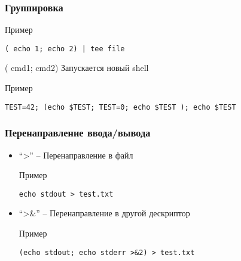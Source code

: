 \begin{frame}[fragile]
	\frametitle{Группировка}
	
	\begin{block}{Пример}
		\begin{lstlisting}
( echo 1; echo 2) | tee file
		\end{lstlisting}
	\end{block}

	\pause
	\begin{block}{( cmd1; cmd2)}
	    Запускается новый shell
	\end{block}

	\begin{block}{Пример}
		\begin{lstlisting}
TEST=42; (echo $TEST; TEST=0; echo $TEST ); echo $TEST
		\end{lstlisting}
	\end{block}

\end{frame}


\begin{frame}[fragile]
	\frametitle{Перенаправление ввода/вывода}

	\begin{itemize}
		\item ``>'' -- Перенаправление в файл
			\begin{block}{Пример}
				\begin{lstlisting}
echo stdout > test.txt
				\end{lstlisting}
			\end{block}
		\item ``>\&'' -- Перенаправление в другой дескриптор
			\begin{block}{Пример}
				\begin{lstlisting}
(echo stdout; echo stderr >&2) > test.txt
				\end{lstlisting}
			\end{block}
	\end{itemize}

\end{frame}



